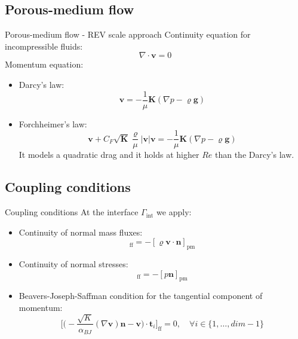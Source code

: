 \documentclass{beamer}
\begin{document}
\subsection*{Porous-medium flow}
\begin{frame}{Porous-medium flow - REV scale approach}
Continuity equation for incompressible fluids:
\begin{equation*}
\nabla \cdot \mathbf{v} = 0
\end{equation*}
Momentum equation:
\begin{itemize}
	\item Darcy's law:
\begin{equation*}
	\mathbf{v} = -\frac{1}{\mu}\mathbf{K} (\nabla p - \varrho \mathbf{g})
\end{equation*}
	\item Forchheimer's law:
	\begin{equation*}
	\mathbf{v} + C_F \sqrt{\mathbf{K}} \frac{\varrho}{\mu} |\mathbf{v}| 
	\mathbf{v} = - \frac{1}{\mu}\mathbf{K} (\nabla p - \varrho \mathbf{g})
	\end{equation*}
	It models a quadratic drag and it holds at higher $Re$ than the Darcy's law.
\end{itemize}
\end{frame}
\subsection*{Coupling conditions}
\begin{frame}{Coupling conditions}
At the interface $\Gamma_\text{int}$ we apply:
\begin{itemize}
	\item Continuity of normal mass fluxes:
	\begin{equation*}
	[\varrho \mathbf{v} \cdot \mathbf{n}]_\text{ff} = - [\varrho \mathbf{v} 
	\cdot \mathbf{n}]_\text{pm}
	\end{equation*}
	\item Continuity of normal stresses:
	\begin{equation*}
	[(\varrho \mathbf{v} \mathbf{v}^\mathrm{T} - (\mu + \mu_t) \nabla 
	\mathbf{v} + p\mathbbm{1}) 
	\mathbf{n}]_\text{ff} = 
	- [p\mathbf{n}]_\text{pm}
	\end{equation*}
	\item Beavers-Joseph-Saffman condition for the tangential component of 
	momentum:
	\begin{equation*}
	\bigg[ \bigg( -\frac{\sqrt{K}}{\alpha_{BJ}} (\nabla \mathbf{v}) 
	\mathbf{n} - \mathbf{v} \bigg) \cdot \mathbf{t}_i \bigg]_\text{ff} = 0, 
	\quad \forall i \in \{1, \dots, dim - 1\}
	\end{equation*}
\end{itemize}
\end{frame}
\end{document}
